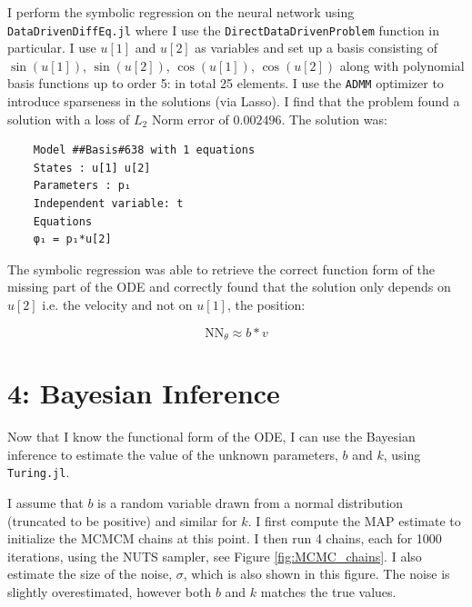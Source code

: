 \documentclass[10pt,a4paper]{article}
\begin{document}
I perform the symbolic regression on the neural network using \texttt{DataDrivenDiffEq.jl}
where I use the \texttt{DirectDataDrivenProblem} function in particular.
I use $u[1]$ and $u[2]$ as variables and set up a basis consisting of
$\sin(u[1])$, $\sin(u[2])$, $\cos(u[1])$, $\cos(u[2])$ along with
polynomial basis functions up to order 5: in total 25 elements.
I use the \texttt{ADMM} optimizer to introduce sparseness in the solutions (via Lasso).
I find that the problem found a solution with a loss of $L_2$ Norm error of $0.002496$.
The solution was:
\begin{verbatim}
    Model ##Basis#638 with 1 equations
    States : u[1] u[2]
    Parameters : p₁
    Independent variable: t
    Equations
    φ₁ = p₁*u[2]
\end{verbatim}

The symbolic regression was able to retrieve the correct function form of the
missing part of the ODE and correctly found that the solution only depends on
$u[2]$ i.e. the velocity and not on $u[1]$, the position:

\begin{equation}
    \mathrm{NN}_\theta \approx b * v
\end{equation}

\section*{4: Bayesian Inference}

Now that I know the functional form of the ODE, I can use the Bayesian inference
to estimate the value of the unknown parameters, $b$ and $k$, using \texttt{Turing.jl}.

I assume that $b$ is a random variable drawn from a normal distribution (truncated to be positive)
and similar for $k$. I first compute the MAP estimate to initialize the MCMCM chains at this point.
I then run 4 chains, each for 1000 iterations, using the NUTS sampler, see Figure \ref{fig:MCMC_chains}.
I also estimate the size of the noise, $\sigma$, which is also shown in this figure.
The noise is slightly overestimated, however both $b$ and $k$ matches the true values.
\end{document}

